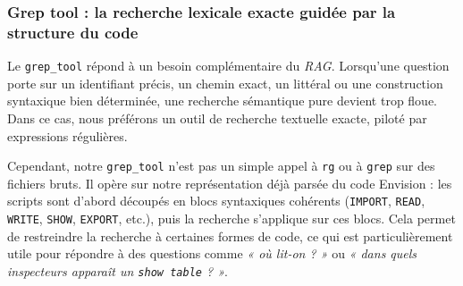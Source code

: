 \subsubsection{Grep tool : la recherche lexicale exacte guidée par la structure du code}

Le \texttt{grep\_tool} répond à un besoin complémentaire du \textit{RAG}. Lorsqu'une question porte sur un identifiant précis, un chemin exact, un littéral ou une construction syntaxique bien déterminée, une recherche sémantique pure devient trop floue. Dans ce cas, nous préférons un outil de recherche textuelle exacte, piloté par expressions régulières.

Cependant, notre \texttt{grep\_tool} n'est pas un simple appel à \texttt{rg} ou à \texttt{grep} sur des fichiers bruts. Il opère sur notre représentation déjà parsée du code Envision : les scripts sont d'abord découpés en blocs syntaxiques cohérents (\texttt{IMPORT}, \texttt{READ}, \texttt{WRITE}, \texttt{SHOW}, \texttt{EXPORT}, etc.), puis la recherche s'applique sur ces blocs. Cela permet de restreindre la recherche à certaines formes de code, ce qui est particulièrement utile pour répondre à des questions comme \textit{« où lit-on  ? »} ou \textit{« dans quels inspecteurs apparaît un \texttt{show table} ? »}.

